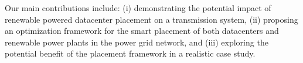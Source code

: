 
 Our main contributions include: (i) demonstrating the potential impact of renewable powered datacenter placement on a transmission system, (ii) proposing an optimization framework for the smart placement of both datacenters and renewable power plants in the power grid network, and (iii) exploring the potential benefit of the placement framework in a realistic case study.





